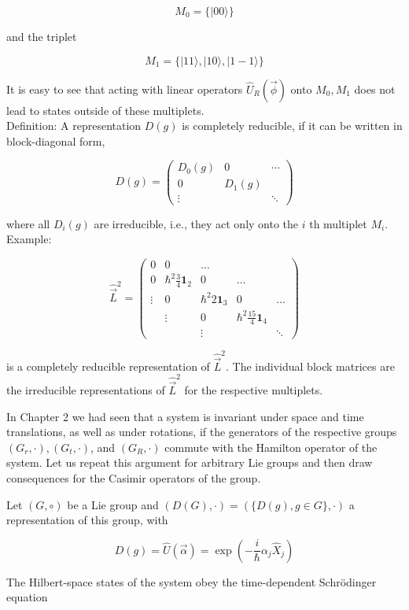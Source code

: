 \documentclass[10pt, letterpaper]{article}
\begin{document}
$$
M_{0}=\{|00\rangle\}
$$

and the triplet

$$
M_{1}=\{|11\rangle,|10\rangle,|1-1\rangle\}
$$

It is easy to see that acting with linear operators $\hat{U}_{R}(\vec{\phi})$ onto $M_{0}, M_{1}$ does not lead to states outside of these multiplets.\\
Definition: A representation $D(g)$ is completely reducible, if it can be written in block-diagonal form,

$$
D(g)=\left(\begin{array}{ccc}
D_{0}(g) & 0 & \cdots \\
0 & D_{1}(g) & \\
\vdots & & \ddots
\end{array}\right)
$$

where all $D_{i}(g)$ are irreducible, i.e., they act only onto the $i$ th multiplet $M_{i}$.\\
Example:

$$
\hat{\vec{L}}^{2}=\left(\begin{array}{ccccc}
0 & 0 & \ldots & & \\
0 & \hbar^{2} \frac{3}{4} \mathbf{1}_{2} & 0 & \ldots & \\
\vdots & 0 & \hbar^{2} 2 \mathbf{1}_{3} & 0 & \ldots \\
& \vdots & 0 & \hbar^{2} \frac{15}{4} \mathbf{1}_{4} & \\
& & \vdots & & \ddots
\end{array}\right)
$$

is a completely reducible representation of $\hat{\vec{L}}^{2}$. The individual block matrices are the irreducible representations of $\hat{\vec{L}}^{2}$ for the respective multiplets.

In Chapter 2 we had seen that a system is invariant under space and time translations, as well as under rotations, if the generators of the respective groups $\left(G_{r}, \cdot\right),\left(G_{t}, \cdot\right)$, and $\left(G_{R}, \cdot\right)$ commute with the Hamilton operator of the system. Let us repeat this argument for arbitrary Lie groups and then draw consequences for the Casimir operators of the group.

Let $(G, \circ)$ be a Lie group and $(D(G), \cdot)=(\{D(g), g \in G\}, \cdot)$ a representation of this group, with

$$
D(g)=\hat{U}(\vec{\alpha})=\exp \left(-\frac{i}{\hbar} \alpha_{j} \hat{X}_{j}\right)
$$

The Hilbert-space states of the system obey the time-dependent Schrödinger equation
\end{document}
